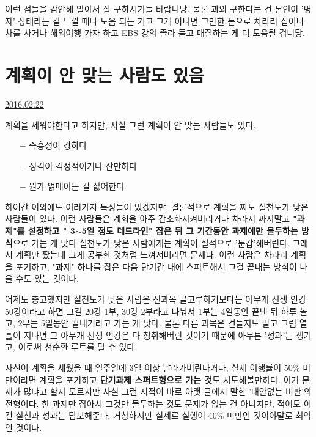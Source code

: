 이런 점들을 감안해 알아서 잘 구하시기들 바랍니당.
물론 과외 구한다는 건 본인이 '병자' 상태라는 걸 느낄 때나 도움 되는 거고
그게 아니면 그만한 돈으로 차라리 집이나 차를 사거나 해외여행 가자 하고 EBS 강의 졸라 듣고 매질하는 게 더 도움될 겁니당.













\section{계획이 안 맞는 사람도 있음}
\href{https://www.kockoc.com/Apoc/645403}{2016.02.22}

\vspace{5mm}

계획을 세워야한다고 하지만, 사실 그런 계획이 안 맞는 사람들도 있다.
\vspace{5mm}

\begin{itemize}
    \item[$-$] 즉흥성이 강하다
    \item[$-$] 성격이 격정적이거나 산만하다
    \item[$-$] 뭔가 얽매이는 걸 싫어한다.
\end{itemize}
\vspace{5mm}

하여간 이외에도 여러가지 특징들이 있겠지만, 결론적으로 계획을 짜도 실천도가 낮은 사람들이 있다.
이런 사람들은 계회을 아주 간소화시켜버리거나 차라지 짜지말고
\textbf{"과제"를 설정하고 " 3$\sim$5일 정도 데드라인" 잡은 뒤 그 기간동안 과제에만 몰두하는 방식}으로 가는 게 낫다
실천도가 낮은 사람에게는 계획이 실적으로 '둔갑'해버린다. 그래서 계획만 짰는데 그게 공부한 것처럼 느껴져버리면 문제다.
이런 사람은 차라리 계획을 포기하고, "과제" 하나를 잡은 다음 단기간 내에 스퍼트해서 그걸 끝내는 방식이 나을 수도 있는 것이다.
\vspace{5mm}

어제도 충고했지만 실천도가 낮은 사람은 전과목 골고루하기보다는
아무개 선생 인강 50강이라고 하면 그걸 20강 1부, 30강 2부라고 나눠서
1부는 4일동안 끝낸 뒤 하루 놀고, 2부는 5일동안 끝내기라고 가는 게 낫다. 물론 다른 과목은 건들지도 말고
그럼 열흘이 지나면 그 아무개 선생 인강은 다 청취해버린 것이기 때문에 아무튼 '성과'는 생기고, 이로써 선순환 루트를 탈 수 있다.
\vspace{5mm}

자신이 계획을 세웠을 때 일주일에 3일 이상 날라가버린다거나, 실제 이행률이 50$\%$ 미만이라면
계획을 포기하고 \textbf{단기과제 스퍼트형으로 가는 것}도 시도해볼만하다.
이거 문제가 많냐고 할지 모르지만 사실 그런 지적이 바로 아랫 글에서 말한 '대안없는 비판'의 전형이다.
한 과제만 잡아서 그것만 몰두하는 것도 문제가 없는 건 아니지만, 적어도 이건 실천과 성과는 담보해준다.
거창하지만 실제로 실행이 40$\%$ 미만인 것이야말로 최악인 것이다.
\vspace{5mm}

